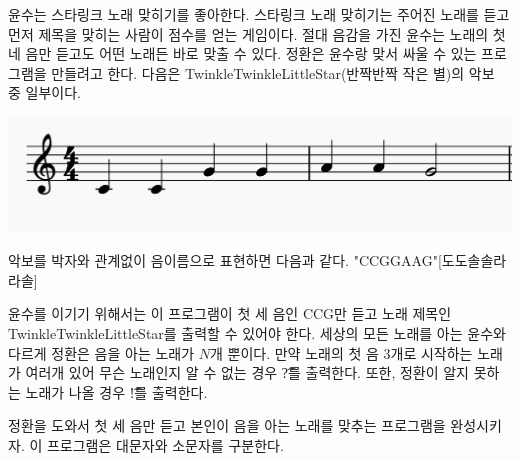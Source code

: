 윤수는 스타링크 노래 맞히기를 좋아한다. 스타링크 노래 맞히기는 주어진 노래를 듣고 먼저 제목을 맞히는 사람이 점수를 얻는 게임이다. 절대 음감을 가진 윤수는 노래의 첫 네 음만 듣고도 어떤 노래든 바로 맞출 수 있다. 정환은 윤수랑 맞서 싸울 수 있는 프로그램을 만들려고 한다. 다음은 TwinkleTwinkleLittleStar(반짝반짝 작은 별)의 악보 중 일부이다.
\begin{center}
\includegraphics[bb=0 0 100 200]{starlink.png}
\end{center} 

악보를 박자와 관계없이 음이름으로 표현하면 다음과 같다. "CCGGAAG"[도도솔솔라라솔]

윤수를 이기기 위해서는 이 프로그램이 첫 세 음인 CCG만 듣고 노래 제목인 TwinkleTwinkleLittleStar를 출력할 수 있어야 한다. 세상의 모든 노래를 아는 윤수와 다르게 정환은 음을 아는 노래가 $N$개 뿐이다. 만약 노래의 첫 음 3개로 시작하는 노래가 여러개 있어 무슨 노래인지 알 수 없는 경우 \t{?}를 출력한다. 또한, 정환이 알지 못하는 노래가 나올 경우 \t{!}를 출력한다.

정환을 도와서 첫 세 음만 듣고 본인이 음을 아는 노래를 맞추는 프로그램을 완성시키자. 이 프로그램은 대문자와 소문자를 구분한다.

